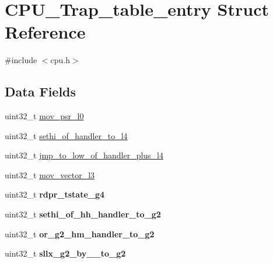 \hypertarget{structCPU__Trap__table__entry}{}\section{C\+P\+U\+\_\+\+Trap\+\_\+table\+\_\+entry Struct Reference}
\label{structCPU__Trap__table__entry}


{\ttfamily \#include $<$cpu.\+h$>$}

\subsection*{Data Fields}
\begin{DoxyCompactItemize}
\item 
uint32\+\_\+t \mbox{\hyperlink{structCPU__Trap__table__entry_a7b5bf63979937f0faab4c9c98f5e4e81}{mov\+\_\+psr\+\_\+l0}}
\item 
uint32\+\_\+t \mbox{\hyperlink{structCPU__Trap__table__entry_ae8670a93c509a7ee0afe51f35edc3393}{sethi\+\_\+of\+\_\+handler\+\_\+to\+\_\+l4}}
\item 
uint32\+\_\+t \mbox{\hyperlink{structCPU__Trap__table__entry_ae8287de69b4c1f4d2461f5e4789c0697}{jmp\+\_\+to\+\_\+low\+\_\+of\+\_\+handler\+\_\+plus\+\_\+l4}}
\item 
uint32\+\_\+t \mbox{\hyperlink{structCPU__Trap__table__entry_a3ab22d0875a0395652bcd4e0d6955240}{mov\+\_\+vector\+\_\+l3}}
\item 
\mbox{\label{structCPU__Trap__table__entry_a4464dd30edbcfafe4c92814e8a3ff2dc}} 
uint32\+\_\+t {\bfseries rdpr\+\_\+tstate\+\_\+g4}
\item 
\mbox{\label{structCPU__Trap__table__entry_a63f0974f978c5937b6f6ccaa5ea5f401}} 
uint32\+\_\+t {\bfseries sethi\+\_\+of\+\_\+hh\+\_\+handler\+\_\+to\+\_\+g2}
\item 
\mbox{\label{structCPU__Trap__table__entry_a83c2620e13331c0e52461dddd71aabcc}} 
uint32\+\_\+t {\bfseries or\+\_\+g2\+\_\+hm\+\_\+handler\+\_\+to\+\_\+g2}
\item 
\mbox{\label{structCPU__Trap__table__entry_a93745e8efaaf38fed8ac86f987aa5a43}} 
uint32\+\_\+t {\bfseries sllx\+\_\+g2\+\_\+by\+\_\+\_\+to\+\_\+g2}
\item 

\end{DoxyCompactItemize}
